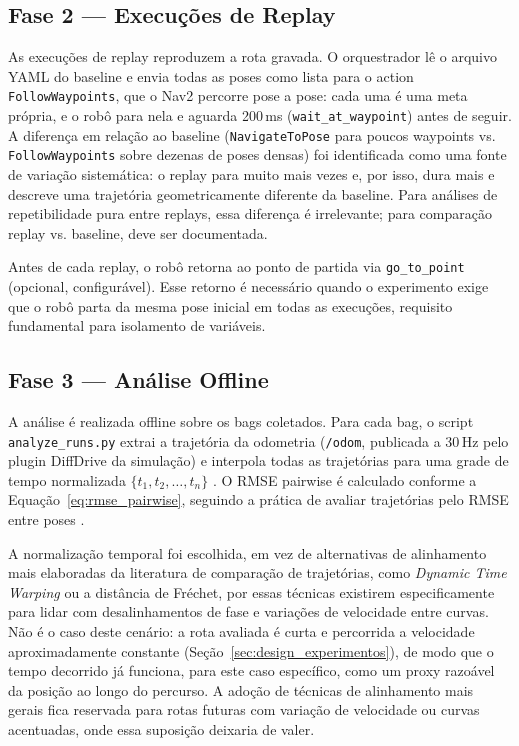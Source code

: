 \subsection{Fase 2 --- Execuções de Replay}

As execuções de replay reproduzem a rota gravada. O orquestrador lê o arquivo
YAML do baseline e envia todas as poses como lista para o action
\texttt{FollowWaypoints}, que o Nav2 percorre pose a pose: cada uma é uma
meta própria, e o robô para nela e aguarda 200\,ms
(\texttt{wait\_\allowbreak at\_\allowbreak waypoint}) antes de seguir. A diferença
em relação ao baseline (\texttt{NavigateToPose} para poucos waypoints vs.
\texttt{FollowWaypoints} sobre dezenas de poses densas) foi identificada como uma
fonte de variação sistemática: o replay para muito mais vezes e, por isso, dura
mais e descreve uma trajetória geometricamente diferente da baseline. Para análises
de repetibilidade pura entre replays, essa diferença é irrelevante; para comparação
replay vs. baseline, deve ser documentada.

Antes de cada replay, o robô retorna ao ponto de partida via \texttt{go\_\allowbreak to\_\allowbreak point}
(opcional, configurável). Esse retorno é necessário quando o experimento exige que
o robô parta da mesma pose inicial em todas as execuções, requisito fundamental
para isolamento de variáveis.

\subsection{Fase 3 --- Análise Offline}

A análise é realizada offline sobre os bags coletados. Para cada bag, o script
\texttt{analyze\_\allowbreak runs.py} extrai a trajetória da odometria
(\texttt{/\allowbreak odom}, publicada a 30\,Hz pelo plugin DiffDrive da simulação)
e interpola todas as trajetórias para uma grade de tempo normalizada $\{t_1, t_2, \ldots, t_n\}$
\cite{amigoni2010}.
O RMSE pairwise é calculado conforme a Equação~\ref{eq:rmse_pairwise},
seguindo a prática de avaliar trajetórias pelo RMSE entre poses
\cite{sturm2012,zhang2018trajectory}.

A normalização temporal foi escolhida, em vez de alternativas de
alinhamento mais elaboradas da literatura de comparação de trajetórias,
como \textit{Dynamic Time Warping} ou a distância de Fréchet, por
essas técnicas existirem especificamente para lidar com desalinhamentos de
fase e variações de velocidade entre curvas. Não é o caso deste cenário: a
rota avaliada é curta e percorrida a velocidade aproximadamente constante
(Seção~\ref{sec:design_experimentos}), de modo que o tempo decorrido já
funciona, para este caso específico, como um proxy razoável da posição ao
longo do percurso. A adoção de técnicas de alinhamento mais gerais fica
reservada para rotas futuras com variação de velocidade ou curvas
acentuadas, onde essa suposição deixaria de valer.

